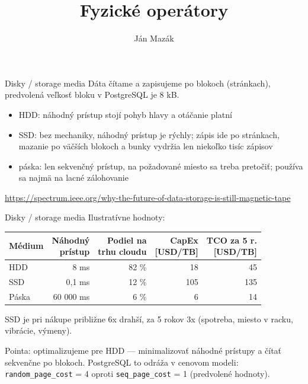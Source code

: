 \documentclass[12pt]{beamer}
\title{Fyzické operátory}
\author{Ján Mazák}
\institute{FMFI UK Bratislava}
\date{}
\begin{document}
\frame{\titlepage}

\begin{frame}[fragile]{Disky / storage media}
Dáta čítame a zapisujeme po blokoch (stránkach), predvolená veľkosť bloku v PostgreSQL je 8 kB.
\begin{itemize}
\item \alert{HDD}: náhodný prístup stojí pohyb hlavy a otáčanie platní
\item \alert{SSD}: bez mechaniky, náhodný prístup je rýchly; zápis ide po stránkach, mazanie po väčších blokoch a bunky vydržia len niekoľko tisíc zápisov
\item \alert{páska}: len sekvenčný prístup, na požadované miesto sa treba pretočiť; používa sa najmä na lacné zálohovanie
\end{itemize}
{\scriptsize\url{https://spectrum.ieee.org/why-the-future-of-data-storage-is-still-magnetic-tape}}
\end{frame}

\begin{frame}[fragile]{Disky / storage media}
Ilustratívne hodnoty:
\par\medskip
\footnotesize
{\renewcommand{\arraystretch}{1.3}
\setlength{\tabcolsep}{4pt}
\begin{tabular}{|l|r|r|r|r|}
\hline
Médium & \parbox[t]{1.8cm}{\centering\rule{0pt}{11pt}Náhodný\\prístup} & \parbox[t]{1.8cm}{\centering\rule{0pt}{11pt}Podiel na\\trhu cloudu} & \parbox[t]{1.8cm}{\centering\rule{0pt}{11pt}CapEx\\{}[USD/TB]} & \parbox[t]{1.8cm}{\centering\rule{0pt}{11pt}TCO za 5 r.\\{}[USD/TB]} \\
\hline
HDD & 8 ms & 82 \% & 18 & 45 \\
SSD & 0,1 ms & 12 \% & 105 & 135 \\
Páska & 60 000 ms & 6 \% & 6 & 14 \\
\hline
\end{tabular}}
\par\medskip
\normalsize
SSD je pri nákupe približne 6x drahší, za 5 rokov 3x (spotreba, miesto v racku, vibrácie, výmeny).
\par\bigskip
\alert{Pointa: optimalizujeme pre HDD} --- minimalizovať náhodné prístupy a čítať sekvenčne po blokoch. PostgreSQL to odráža v cenovom modeli: \texttt{random\_page\_cost} = 4 oproti \texttt{seq\_page\_cost} = 1 (predvolené hodnoty).
\end{frame}
\end{document}

